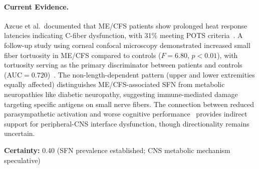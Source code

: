 \begin{speculation}
\paragraph{Current Evidence.}
Azcue et al.\ documented that ME/CFS patients show prolonged heat response latencies indicating C-fiber dysfunction, with 31\% meeting POTS criteria~\cite{Azcue2023sfn}. A follow-up study using corneal confocal microscopy demonstrated increased small fiber tortuosity in ME/CFS compared to controls ($F=6.80$, $p<0.01$), with tortuosity serving as the primary discriminator between patients and controls (AUC$=0.720$)~\cite{Azcue2025sfn}. The non-length-dependent pattern (upper and lower extremities equally affected) distinguishes ME/CFS-associated SFN from metabolic neuropathies like diabetic neuropathy, suggesting immune-mediated damage targeting specific antigens on small nerve fibers. The connection between reduced parasympathetic activation and worse cognitive performance~\cite{Azcue2023sfn} provides indirect support for peripheral-CNS interface dysfunction, though directionality remains uncertain.

\textbf{Certainty:} 0.40 (SFN prevalence established; CNS metabolic mechanism speculative)
\end{speculation}

